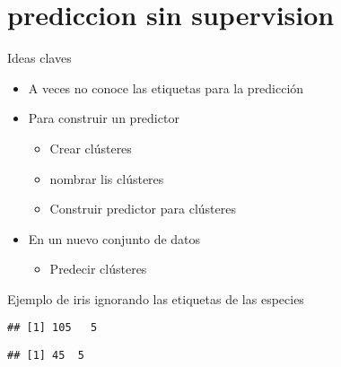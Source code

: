 \documentclass[
]{article}
\newenvironment{Shaded}{\begin{snugshade}}{\end{snugshade}}
\newcommand{\AttributeTok}[1]{\textcolor[rgb]{0.77,0.63,0.00}{#1}}
\newcommand{\ConstantTok}[1]{\textcolor[rgb]{0.00,0.00,0.00}{#1}}
\newcommand{\FloatTok}[1]{\textcolor[rgb]{0.00,0.00,0.81}{#1}}
\newcommand{\FunctionTok}[1]{\textcolor[rgb]{0.00,0.00,0.00}{#1}}
\newcommand{\NormalTok}[1]{#1}
\newcommand{\OtherTok}[1]{\textcolor[rgb]{0.56,0.35,0.01}{#1}}
\newcommand{\SpecialCharTok}[1]{\textcolor[rgb]{0.00,0.00,0.00}{#1}}
\providecommand{\tightlist}{%
  \setlength{\itemsep}{0pt}\setlength{\parskip}{0pt}}
\begin{document}
\hypertarget{prediccion-sin-supervision}{%
\section{prediccion sin supervision}\label{prediccion-sin-supervision}}

Ideas claves

\begin{itemize}
\tightlist
\item
  A veces no conoce las etiquetas para la predicción
\item
  Para construir un predictor

  \begin{itemize}
  \tightlist
  \item
    Crear clústeres
  \item
    nombrar lis clústeres
  \item
    Construir predictor para clústeres
  \end{itemize}
\item
  En un nuevo conjunto de datos

  \begin{itemize}
  \tightlist
  \item
    Predecir clústeres
  \end{itemize}
\end{itemize}

Ejemplo de iris ignorando las etiquetas de las especies

\begin{Shaded}
\end{Shaded}

\begin{verbatim}
## [1] 105   5
\end{verbatim}

\begin{verbatim}
## [1] 45  5
\end{verbatim}
\end{document}
